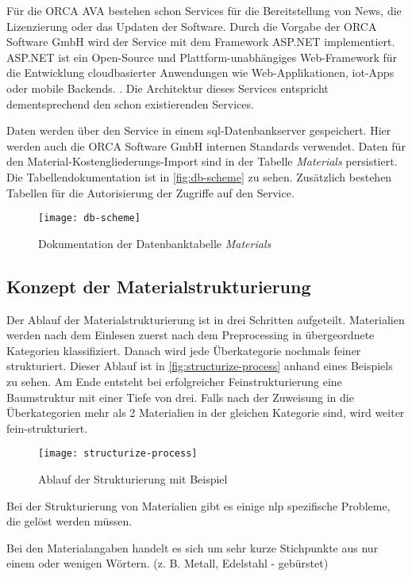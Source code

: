 Für die ORCA AVA bestehen schon Services für die Bereitstellung von News, die Lizenzierung oder das Updaten der Software. Durch die Vorgabe der ORCA Software GmbH wird der Service mit dem Framework ASP.NET implementiert. ASP.NET ist ein Open-Source und Plattform-unabhängiges Web-Framework für die Entwicklung cloudbasierter Anwendungen wie Web-Applikationen, \ac{iot}-Apps oder mobile Backends. \citep[vgl.][]{asp-net}. Die Architektur dieses Services entspricht dementsprechend den schon existierenden Services.

Daten werden über den Service in einem \ac{sql}-Datenbankserver gespeichert. Hier werden auch die ORCA Software GmbH internen Standards verwendet. Daten für den Material-Kostengliederungs-Import sind in der Tabelle \textit{Materials} persistiert. Die Tabellendokumentation ist in \autoref{fig:db-scheme} zu sehen. Zusätzlich bestehen Tabellen für die Autorisierung der Zugriffe auf den Service.

\begin{figure}[h]
	\centering
	\texttt{[image: db-scheme]}
	\caption{Dokumentation der Datenbanktabelle \textit{Materials}}
	\label{fig:db-scheme}
\end{figure}

\subsection{Konzept der Materialstrukturierung}
\label{c:conception:architecture:structuring}
Der Ablauf der Materialstrukturierung ist in drei Schritten aufgeteilt. Materialien werden nach dem Einlesen zuerst nach dem Preprocessing in übergeordnete Kategorien klassifiziert. Danach wird jede Überkategorie nochmals feiner strukturiert.
Dieser Ablauf ist in \autoref{fig:structurize-process} anhand eines Beispiels zu sehen. Am Ende entsteht bei erfolgreicher Feinstrukturierung eine Baumstruktur mit einer Tiefe von drei. Falls nach der Zuweisung in die Überkategorien mehr als 2 Materialien in der gleichen Kategorie sind, wird weiter fein-strukturiert.

\begin{figure}[h]
	\centering
	\texttt{[image: structurize-process]}
	\caption{Ablauf der Strukturierung mit Beispiel}
	\label{fig:structurize-process}
\end{figure}

Bei der Strukturierung von Materialien gibt es einige \ac{nlp} spezifische Probleme, die gelöst werden müssen. 
\begin{problem}
	\label{p:shorttext}
	Bei den Materialangaben handelt es sich um sehr kurze Stichpunkte aus nur einem oder wenigen Wörtern. (z. B. Metall, Edelstahl - gebürstet)
\end{problem}

